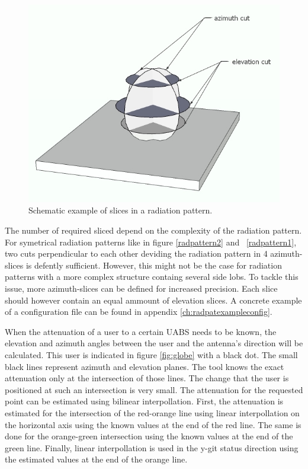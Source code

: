 \begin{figure}[H]
  \includegraphics[width=\textwidth]{../images/3Dimages/slicesOfPattern.jpg}
  \caption{Schematic example of slices in a radiation pattern.}
  \label{fig:slicesOfPattern}
\end{figure}

The number of required sliced depend on the complexity of the radiation pattern. For symetrical radiation patterns like 
in figure \ref{radpattern2} and  \ref{radpattern1}, two cuts perpendicular to each other deviding the radiation pattern in 4 azimuth-slices 
is defently sufficient. However, this might not be the case for radiation patterns with a more complex structure containg several  
side lobs. To tackle this issue, more azimuth-slices can be defined for increased precision. Each slice should however contain an equal ammount 
of elevation slices.  A concrete example of a configuration file can be found in appendix \ref{ch:radpatexampleconfig}.

When the attenuation of a user to a certain \gls{UABS} needs to be known, the elevation and azimuth angles between the user and the antenna's direction 
will be calculated. This user is indicated in figure \ref{fig:globe} with a black dot. The small black lines represent azimuth and elevation planes. 
The tool knows the exact attenuation only at the intersection of those lines. 
The change that the user is positioned at such an intersection is very small. The attenuation for the requested point can be estimated using bilinear interpollation.
First, the attenuation is estimated for the intersection of the red-orange line using linear interpollation on the horizontal axis using the known values
 at the end of the red line. The same is done for the orange-green intersection using the known values at the end of the green line. Finally, linear interpollation is used in the y-git status
 direction using the estimated values at the end of 
the orange line.

